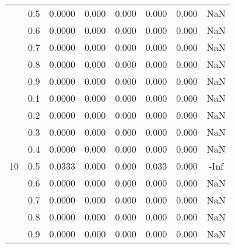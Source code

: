 \documentclass[11pt,a4paper]{report}
\begin{document}
\begin{longtable}{ | c | c || c | c | c | c | c | c | }
 & 0.5 & 0.0000 & 0.000 & 0.000 & 0.000 & 0.000 & NaN \\
 & 0.6 & 0.0000 & 0.000 & 0.000 & 0.000 & 0.000 & NaN \\
 & 0.7 & 0.0000 & 0.000 & 0.000 & 0.000 & 0.000 & NaN \\
 & 0.8 & 0.0000 & 0.000 & 0.000 & 0.000 & 0.000 & NaN \\
 & 0.9 & 0.0000 & 0.000 & 0.000 & 0.000 & 0.000 & NaN \\
 \hline
\multirow{9}{*}{10} & 0.1 & 0.0000 & 0.000 & 0.000 & 0.000 & 0.000 & NaN \\
 & 0.2 & 0.0000 & 0.000 & 0.000 & 0.000 & 0.000 & NaN \\
 & 0.3 & 0.0000 & 0.000 & 0.000 & 0.000 & 0.000 & NaN \\
 & 0.4 & 0.0000 & 0.000 & 0.000 & 0.000 & 0.000 & NaN \\
 & 0.5 & 0.0333 & 0.000 & 0.000 & 0.033 & 0.000 & -Inf \\
 & 0.6 & 0.0000 & 0.000 & 0.000 & 0.000 & 0.000 & NaN \\
 & 0.7 & 0.0000 & 0.000 & 0.000 & 0.000 & 0.000 & NaN \\
 & 0.8 & 0.0000 & 0.000 & 0.000 & 0.000 & 0.000 & NaN \\
 & 0.9 & 0.0000 & 0.000 & 0.000 & 0.000 & 0.000 & NaN \\
 \hline
\hline
\end{longtable}
\end{document}
